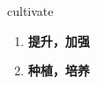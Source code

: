 
\begin{frame}
{\huge cultivate}
\begin{center}
\begin{enumerate}\Large
  \item \textbf{提升，加强}
  \item \textbf{种植，培养}
\end{enumerate}
\end{center}
\end{frame}
